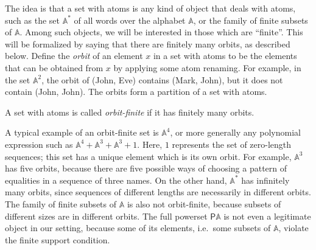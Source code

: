 \documentclass[10pt,a4paper]{amsart}
\numberwithin{equation}{section}
\theoremstyle{plain}
\newcommand{\myunderbrace}[2]{\underbrace{#1}_{\mathclap{\text{\scriptsize 
\begin{tabular}{c}
	#2
\end{tabular} }}}}
\newcommand{\set}[1]{\{#1\}}
\newcommand{\powerset}{\mathsf P}
\newcommand{\atoms}{\mathbb A}
\newcommand{\setbuild}[2]{\set{#1 \ | 
\begin{tabular}{l}
	#2
\end{tabular}\!\!} }
\begin{document}
The idea is that a set with atoms is any kind of object that deals with atoms, such as the set $\atoms^*$ of all words over the alphabet $\atoms$, or the family of finite subsets of $\atoms$. Among such objects, we will be interested in those which are ``finite''. This will be formalized by  saying that there are  finitely many orbits, as described below.
Define the \emph{orbit} of an element $x$ in a set with atoms to be the elements that can be obtained from $x$ by applying some atom renaming. For example, in the set $\atoms^2$,  the orbit of (John, Eve)   contains  (Mark, John), but it does not contain (John, John). The orbits form a partition of a set with atoms. 


\begin{definition}   A set with atoms is called \emph{orbit-finite} if it has finitely many orbits. 
\end{definition}

A typical example of an orbit-finite set is $\atoms^4$, or more generally any polynomial expression such as $\atoms^4 + \atoms^3 + \atoms^3 + 1$. Here, $1$ represents the set of zero-length sequences; this set has a unique element which is its own orbit.  For  example,  $\atoms^3$ has five orbits, because there are five possible ways of choosing a pattern of equalities in a sequence of three names. On the other hand,  $\atoms^*$ has infinitely many orbits, since sequences of different lengths are necessarily in different orbits.   The family of finite subsets of $\atoms$  is also  not orbit-finite, because subsets of different sizes are in different orbits. The full powerset $\powerset \atoms$ is not even a legitimate object in our setting, because some of its elements, i.e.~some subsets of $\atoms$, violate the finite support condition.

        
\end{document}
